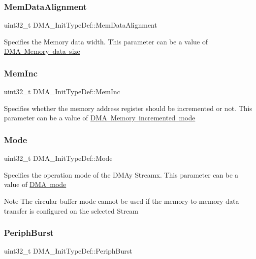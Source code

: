 \subsubsection{\texorpdfstring{MemDataAlignment}{MemDataAlignment}}
{\footnotesize\ttfamily uint32\+\_\+t D\+M\+A\+\_\+\+Init\+Type\+Def\+::\+Mem\+Data\+Alignment}

Specifies the Memory data width. This parameter can be a value of \mbox{\hyperlink{group___d_m_a___memory__data__size}{D\+MA Memory data size}} \mbox{\label{struct_d_m_a___init_type_def_a49b187ba5ab8ba4354e02837e8b99414}} 
\subsubsection{\texorpdfstring{MemInc}{MemInc}}
{\footnotesize\ttfamily uint32\+\_\+t D\+M\+A\+\_\+\+Init\+Type\+Def\+::\+Mem\+Inc}

Specifies whether the memory address register should be incremented or not. This parameter can be a value of \mbox{\hyperlink{group___d_m_a___memory__incremented__mode}{D\+MA Memory incremented mode}} \mbox{\label{struct_d_m_a___init_type_def_adbbca090b53d32ac93cc7359b7994db2}} 
\subsubsection{\texorpdfstring{Mode}{Mode}}
{\footnotesize\ttfamily uint32\+\_\+t D\+M\+A\+\_\+\+Init\+Type\+Def\+::\+Mode}

Specifies the operation mode of the D\+M\+Ay Streamx. This parameter can be a value of \mbox{\hyperlink{group___d_m_a__mode}{D\+MA mode}} \begin{DoxyNote}{Note}
The circular buffer mode cannot be used if the memory-\/to-\/memory data transfer is configured on the selected Stream 
\end{DoxyNote}
\mbox{\label{struct_d_m_a___init_type_def_a3fbfe4dd664e24845dc75f5c8f43b5a3}} 
\subsubsection{\texorpdfstring{PeriphBurst}{PeriphBurst}}
{\footnotesize\ttfamily uint32\+\_\+t D\+M\+A\+\_\+\+Init\+Type\+Def\+::\+Periph\+Burst}

